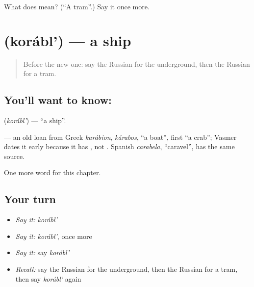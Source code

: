 \begin{tcolorbox}[breakable,colback=teal!4,colframe=teal!35!black,title={Before you move on}]
What does  mean? (\textquotedblleft{}A tram\textquotedblright{}.) Say it once more.
\end{tcolorbox}
\section[\texorpdfstring{\ru{корабль} (korábl')}{корабль (korábl')}]{ (korábl') — a ship}

\label{lesson:RU-C91-ship}



\begin{quote}
Before the new one: say the Russian for the underground, then the Russian for a tram.
\end{quote}

\subsection*{You'll want to know: }
\textbf{} (\emph{korábl'}) — \textquotedblleft{}a ship\textquotedblright{}.

\begin{cousinweb}
\textbf{} — an old loan from Greek \emph{karábion}, \emph{kárabos}, \textquotedblleft{}a boat\textquotedblright{}, first \textquotedblleft{}a crab\textquotedblright{}; Vasmer dates it early because it has \emph{}, not \emph{}. Spanish \emph{carabela}, \textquotedblleft{}caravel\textquotedblright{}, has the same source.
\end{cousinweb}

\begin{grammarlens}[title={What you've built}]
One more word for this chapter.
\end{grammarlens}

\subsection*{Your turn}
\begin{itemize}
\raggedright
  \item \emph{Say it:} \emph{korábl'}
  \item \emph{Say it:} \emph{korábl'}, once more
  \item \emph{Say it:} say \emph{korábl'}
  \item \emph{Recall:} say the Russian for the underground, then the Russian for a tram, then say \emph{korábl'} again
\end{itemize}

